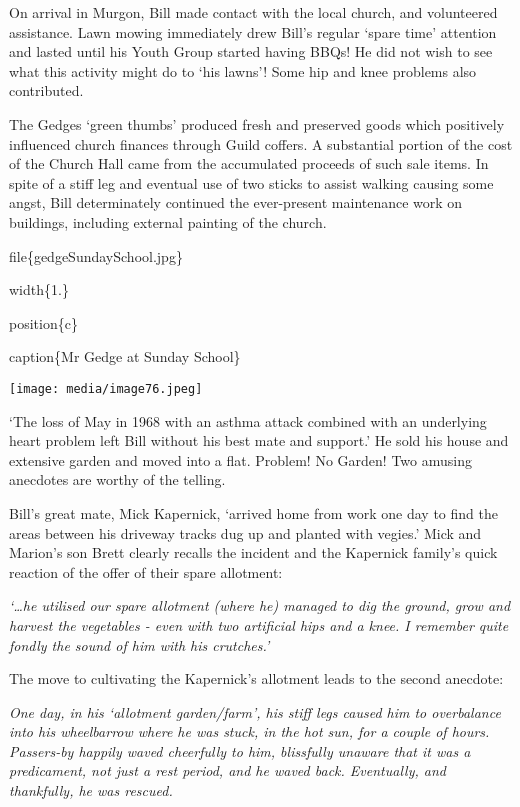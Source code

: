 On arrival in Murgon, Bill made contact with the local church, and volunteered assistance. Lawn mowing immediately drew Bill's regular `spare time' attention and lasted until his Youth Group started having BBQs! He did not wish to see what this activity might do to `his lawns'! Some hip and knee problems also contributed.

The Gedges `green thumbs' produced fresh and preserved goods which positively influenced church finances through Guild coffers. A substantial portion of the cost of the Church Hall came from the accumulated proceeds of such sale items. In spite of a stiff leg and eventual use of two sticks to assist walking causing some angst, Bill determinately continued the ever-present maintenance work on buildings, including external painting of the church.

file\{gedgeSundaySchool.jpg\}

width\{1.\}

position\{c\}

caption\{Mr Gedge at Sunday School\}

\texttt{[image: media/image76.jpeg]}

`The loss of May in 1968 with an asthma attack combined with an underlying heart problem left Bill without his best mate and support.' He sold his house and extensive garden and moved into a flat. Problem! No Garden! Two amusing anecdotes are worthy of the telling.

Bill's great mate, Mick Kapernick, `arrived home from work one day to find the areas between his driveway tracks dug up and planted with vegies.' Mick and Marion's son Brett clearly recalls the incident and the Kapernick family's quick reaction of the offer of their spare allotment:

\emph{`\ldots he utilised our spare allotment (where he) managed to dig the ground, grow and harvest the vegetables - even with two artificial hips and a knee. I remember quite fondly the sound of him with his crutches.'}

The move to cultivating the Kapernick's allotment leads to the second anecdote:

\emph{One day, in his `allotment garden/farm', his stiff legs caused him to overbalance into his wheelbarrow where he was stuck, in the hot sun, for a couple of hours. Passers-by happily waved cheerfully to him, blissfully unaware that it was a predicament, not just a rest period, and he waved back. Eventually, and thankfully, he was rescued.}

